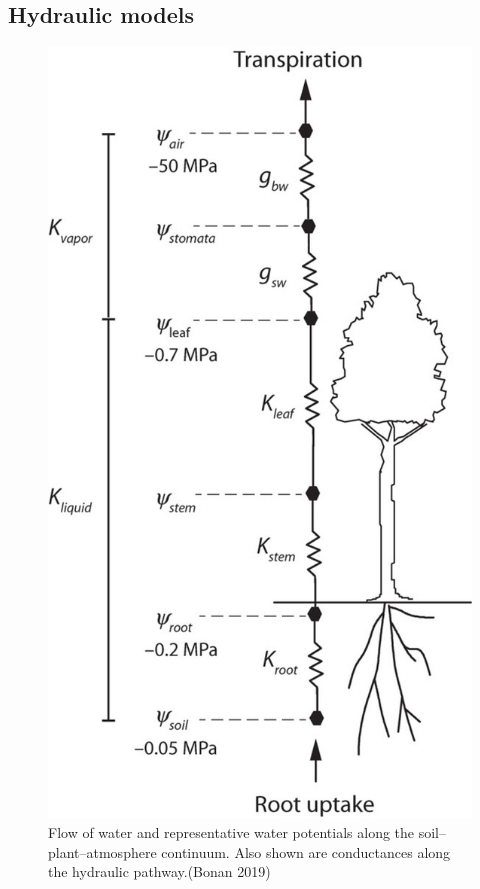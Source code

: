\documentclass[
  oneside]{book}
\begin{document}
\hypertarget{hydraulic-models}{%
\subsection{Hydraulic models}\label{hydraulic-models}}

\begin{figure}

{\centering \includegraphics[width=0.8\linewidth]{figures/chap2/hydraulics} 

}

\caption{Flow of water and representative water potentials along the soil–plant–atmosphere continuum. Also shown are conductances along the hydraulic pathway.(Bonan 2019)}\label{fig:f218}
\end{figure}
\end{document}
